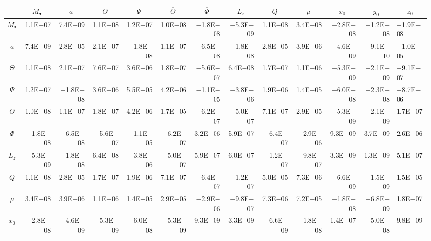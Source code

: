 \begin{sidewaystable}[htbp]\squeezetable
\centering
\begin{tabular}{crrrrrrrrrrr}
\toprule
 &  &  &  &  &  &  &  &  &  &  &  &  \\ \midrule 
$M_\bullet$ & 1.1E$-$07 & 7.4E$-$09 & 1.1E$-$08 & 1.2E$-$07 & 1.0E$-$08 & $-$1.8E$-$08 & $-$5.3E$-$09 & 1.1E$-$08 & 3.4E$-$08 & $-$2.8E$-$08 & $-$1.2E$-$08 & $-$1.9E$-$08 \\
$a$ & 7.4E$-$09 & 2.8E$-$05 & 2.1E$-$07 & $-$1.8E$-$08 & 1.1E$-$07 & $-$6.5E$-$08 & $-$1.8E$-$08 & 2.8E$-$05 & 3.9E$-$06 & $-$4.6E$-$09 & $-$9.1E$-$10 & $-$1.0E$-$05 \\
$\Theta$ & 1.1E$-$08 & 2.1E$-$07 & 7.6E$-$07 & 3.6E$-$06 & 1.8E$-$07 & $-$5.6E$-$07 & 6.4E$-$08 & 1.7E$-$07 & 1.1E$-$06 & $-$5.3E$-$09 & $-$2.1E$-$09 & $-$9.1E$-$07 \\
$\Psi$ & 1.2E$-$07 & $-$1.8E$-$08 & 3.6E$-$06 & 5.5E$-$05 & 4.2E$-$06 & $-$1.1E$-$05 & $-$3.8E$-$06 & 1.9E$-$06 & 1.4E$-$05 & $-$6.0E$-$08 & $-$2.3E$-$08 & $-$8.7E$-$06 \\
$\overline{\Theta}$ & 1.0E$-$08 & 1.1E$-$07 & 1.8E$-$07 & 4.2E$-$06 & 1.7E$-$05 & $-$6.2E$-$07 & $-$5.0E$-$07 & 7.1E$-$07 & 2.9E$-$05 & $-$5.3E$-$09 & $-$2.1E$-$09 & 1.7E$-$07 \\
$\overline{\Phi}$ & $-$1.8E$-$08 & $-$6.5E$-$08 & $-$5.6E$-$07 & $-$1.1E$-$05 & $-$6.2E$-$07 & 3.2E$-$06 & 5.9E$-$07 & $-$6.4E$-$07 & $-$2.9E$-$06 & 9.3E$-$09 & 3.7E$-$09 & 2.6E$-$06 \\
$L_z$ & $-$5.3E$-$09 & $-$1.8E$-$08 & 6.4E$-$08 & $-$3.8E$-$06 & $-$5.0E$-$07 & 5.9E$-$07 & 6.0E$-$07 & $-$1.2E$-$07 & $-$9.8E$-$07 & 3.3E$-$09 & 1.3E$-$09 & 5.1E$-$07 \\
$Q$ & 1.1E$-$08 & 2.8E$-$05 & 1.7E$-$07 & 1.9E$-$06 & 7.1E$-$07 & $-$6.4E$-$07 & $-$1.2E$-$07 & 5.0E$-$05 & 7.3E$-$06 & $-$6.6E$-$09 & $-$1.5E$-$09 & 1.5E$-$05 \\
$\mu$ & 3.4E$-$08 & 3.9E$-$06 & 1.1E$-$06 & 1.4E$-$05 & 2.9E$-$05 & $-$2.9E$-$06 & $-$9.8E$-$07 & 7.3E$-$06 & 7.2E$-$05 & $-$1.8E$-$08 & $-$6.8E$-$09 & 1.8E$-$07 \\
$x_0$ & $-$2.8E$-$08 & $-$4.6E$-$09 & $-$5.3E$-$09 & $-$6.0E$-$08 & $-$5.3E$-$09 & 9.3E$-$09 & 3.3E$-$09 & $-$6.6E$-$09 & $-$1.8E$-$08 & 1.4E$-$07 & $-$5.0E$-$08 & 9.8E$-$09 \\

\end{tabular}
\end{sidewaystable}
